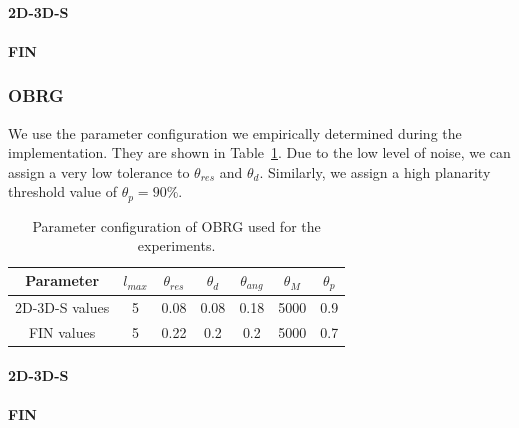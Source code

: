 \documentclass[main.tex]{subfiles}
\begin{document}
\paragraph{2D-3D-S}
\paragraph{FIN}

\subsubsection{OBRG}
We use the parameter configuration we empirically determined during the implementation. They are shown in Table~\ref{tab:obrg-param}.
Due to the low level of noise, we can assign a very low tolerance to $\theta_{res}$ and $\theta_d$. Similarly, we assign a high
planarity threshold value of $\theta_p = 90\%$.
\begin{table}[H]
    \centering
    \begin{tabular}{c|cccccc}
        Parameter      & $l_{max}$ & $\theta_{res}$ & $\theta_{d}$ & $\theta_{ang}$ & $\theta_M$ & $\theta_p$ \\ \hline
        2D-3D-S values & 5         & 0.08           & 0.08         & 0.18           & 5000       & 0.9        \\
        FIN values     & 5         & 0.22           & 0.2          & 0.2            & 5000       & 0.7
    \end{tabular}
    \caption{Parameter configuration of OBRG used for the experiments.}
    \label{tab:obrg-param}
\end{table}
\paragraph{2D-3D-S}
\paragraph{FIN}



\end{document}
